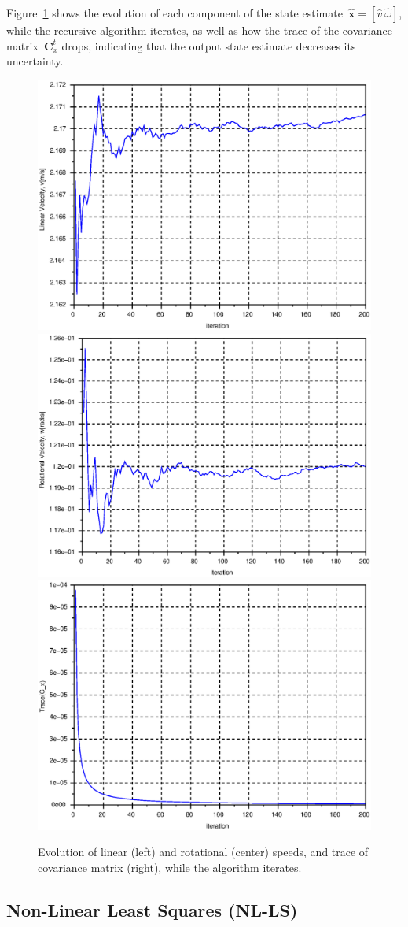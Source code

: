 Figure~\ref{fig:vw_plot_rw-ls} shows the evolution of each component of the state estimate~$\hat{\mathbf{x}}=[\hat{v}\ \hat{\omega}]$, while the recursive algorithm iterates, as well as how the trace of the covariance matrix~$\mathbf{C}^t_x$ drops, indicating that the output state estimate decreases its uncertainty. 
\begin{figure}[h!]
  \centering
  \includegraphics[width=0.32\linewidth]{figures/v_linear_rw-ls.eps}
  \hspace{0mm}
  \includegraphics[width=0.32\linewidth]{figures/w_rotational_rw-ls.eps}
  \hspace{0mm}
  \includegraphics[width=0.32\linewidth]{figures/trCx_rw-ls.eps}
  \hspace{0mm}
  \caption{Evolution of linear (left) and rotational (center) speeds, and trace of covariance matrix (right), while the algorithm iterates.}
  \label{fig:vw_plot_rw-ls}
\end{figure}










\subsection{Non-Linear Least Squares (NL-LS)}


